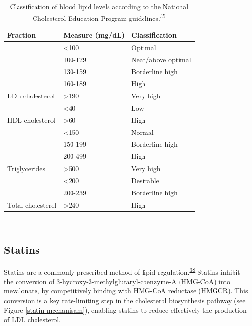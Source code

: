 \documentclass[a4paper, twoside]{templates/ociamthesis}
\begin{document}
\begin{table}[H]

\caption[Classification of blood lipid levels]{\label{tab:lipidLevels-table}Classification of blood lipid levels according to the National Cholesterol Education Program guidelines.\textsuperscript{\protect\hyperlink{ref-national2002third}{35}}}
\centering
\begin{tabular}[t]{lll}
\toprule
\textbf{Fraction} & \textbf{Measure (mg/dL)} & \textbf{Classification}\\
\midrule
 & <100 & Optimal\\
\cmidrule{2-3}
 & 100-129 & Near/above optimal\\
\cmidrule{2-3}
 & 130-159 & Borderline high\\
\cmidrule{2-3}
 & 160-189 & High\\
\cmidrule{2-3}
\multirow{-5}{*}{\raggedright\arraybackslash LDL cholesterol} & >190 & Very high\\
\cmidrule{1-3}
 & <40 & Low\\
\cmidrule{2-3}
\multirow{-2}{*}{\raggedright\arraybackslash HDL cholesterol} & >60 & High\\
\cmidrule{1-3}
 & <150 & Normal\\
\cmidrule{2-3}
 & 150-199 & Borderline high\\
\cmidrule{2-3}
 & 200-499 & High\\
\cmidrule{2-3}
\multirow{-4}{*}{\raggedright\arraybackslash Triglycerides} & >500 & Very high\\
\cmidrule{1-3}
 & <200 & Desirable\\
\cmidrule{2-3}
 & 200-239 & Borderline high\\
\cmidrule{2-3}
\multirow{-3}{*}{\raggedright\arraybackslash Total cholesterol} & >240 & High\\
\bottomrule
\end{tabular}
\end{table}

~

\hypertarget{intro-statins}{%
\subsection{Statins}\label{intro-statins}}

Statins are a commonly prescribed method of lipid regulation.\textsuperscript{\protect\hyperlink{ref-collins2016}{38}} Statins inhibit the conversion of 3-hydroxy-3-methylglutaryl-coenzyme-A (HMG-CoA) into mevalonate, by competitively binding with HMG-CoA reductase (HMGCR). This conversion is a key rate-limiting step in the cholesterol biosynthesis pathway (see Figure \ref{statin-mechanisam}), enabling statins to reduce effectively the production of LDL cholesterol.
\end{document}
